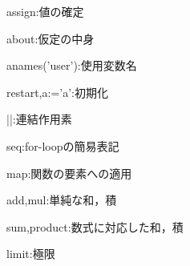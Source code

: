 \documentclass{article}
\begin{document}
\begin{maplelatex}\begin{Maple Normal}{
assign:値の確定}\end{Maple Normal}
\end{maplelatex}
\begin{maplelatex}\begin{Maple Normal}{
about:仮定の中身}\end{Maple Normal}
\end{maplelatex}
\begin{maplelatex}\begin{Maple Normal}{
anames('user'):使用変数名}\end{Maple Normal}
\end{maplelatex}
\begin{maplelatex}\begin{Maple Normal}{
restart,a:='a':初期化}\end{Maple Normal}
\end{maplelatex}
\begin{maplelatex}\begin{Maple Normal}{
}\end{Maple Normal}
\end{maplelatex}
\begin{maplelatex}\begin{Maple Normal}{
||:連結作用素}\end{Maple Normal}
\end{maplelatex}
\begin{maplelatex}\begin{Maple Normal}{
seq:for-loopの簡易表記}\end{Maple Normal}
\end{maplelatex}
\begin{maplelatex}\begin{Maple Normal}{
map:関数の要素への適用}\end{Maple Normal}
\end{maplelatex}
\begin{maplelatex}\begin{Maple Normal}{
add,mul:単純な和，積}\end{Maple Normal}
\end{maplelatex}
\begin{maplelatex}\begin{Maple Normal}{
sum,product:数式に対応した和，積}\end{Maple Normal}
\end{maplelatex}
\begin{maplelatex}\begin{Maple Normal}{
limit:極限}\end{Maple Normal}
\end{maplelatex}
\end{document}
